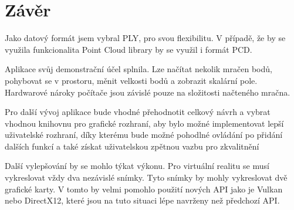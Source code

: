 \chapter{Závěr}

Jako datový formát jsem vybral PLY, pro svou flexibilitu. V případě, že by se využila funkcionalita Point Cloud library by se využil i formát PCD.

Aplikace svůj demonstrační účel splnila. Lze načítat nekolik mračen bodů, pohybovat se v prostoru, měnit velkosti bodů a zobrazit skalární pole. Hardwarové nároky počítače jsou závislé pouze na složitosti načteného mračna.

Pro další vývoj aplikace bude vhodné přehodnotit celkový návrh a vybrat vhodnou knihovnu pro grafické rozhraní, aby bylo možné implementovat lepší uživatelské rozhraní, díky kterému bude možné pohodlné ovládání po přidání dalších funkcí a také získat uživatelskou zpětnou vazbu pro zkvalitnění 

Další vylepšování by se mohlo týkat výkonu. Pro virtuální realitu se musí vykreslovat vždy dva nezávislé snímky. Tyto snímky by mohly vykreslovat dvě grafické karty. V tomto by velmi pomohlo použití nových API jako je Vulkan nebo DirectX12, které jsou na tuto situaci lépe navrženy než předchozí API.

